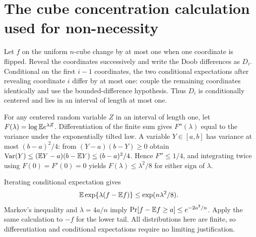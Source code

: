 \section{The cube concentration calculation used for non-necessity}\label{app:concentration}
Let $f$ on the uniform $n$-cube change by at most one when one coordinate is flipped. Reveal the coordinates successively and write the Doob differences as $D_i$. Conditional on the first $i-1$ coordinates, the two conditional expectations after revealing coordinate $i$ differ by at most one: couple the remaining coordinates identically and use the bounded-difference hypothesis. Thus $D_i$ is conditionally centered and lies in an interval of length at most one.

For any centered random variable $Z$ in an interval of length one, let $F(\lambda)=\log\mathbb E e^{\lambda Z}$. Differentiation of the finite sum gives $F''(\lambda)$ equal to the variance under the exponentially tilted law. A variable $Y\in[a,b]$ has variance at most $(b-a)^2/4$: from $(Y-a)(b-Y)\ge0$ obtain $\operatorname{Var}(Y)\le(\mathbb E Y-a)(b-\mathbb E Y)\le(b-a)^2/4$. Hence $F''\le1/4$, and integrating twice using $F(0)=F'(0)=0$ yields $F(\lambda)\le\lambda^2/8$ for either sign of $\lambda$.

Iterating conditional expectation gives
\[
 \mathbb E\exp\{\lambda(f-\mathbb E f)\}\le\exp(n\lambda^2/8).
\]
Markov's inequality and $\lambda=4a/n$ imply $\Pr[f-\mathbb E f\ge a]\le e^{-2a^2/n}$. Apply the same calculation to $-f$ for the lower tail. All distributions here are finite, so differentiation and conditional expectations require no limiting justification.
